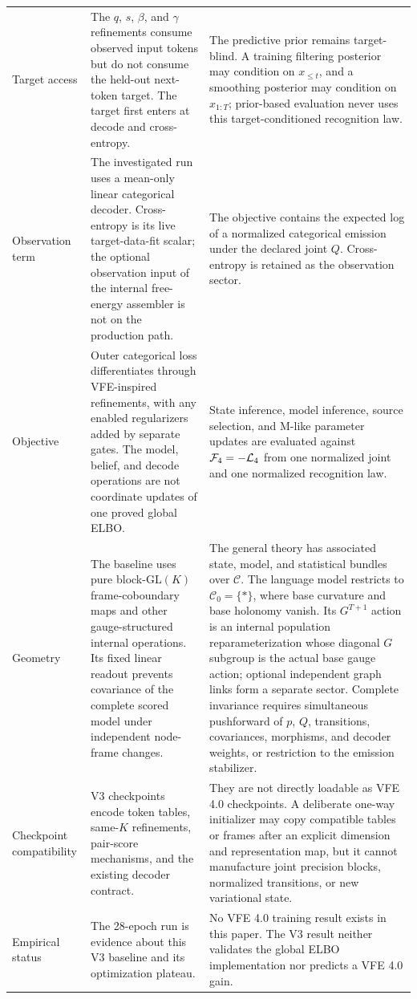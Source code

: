 \begin{longtable}{>{\raggedright\arraybackslash}p{} >{\raggedright\arraybackslash}p{} >{\raggedright\arraybackslash}p{}}
\addlinespace
Target access
& The $q$, $s$, $\beta$, and $\gamma$ refinements consume observed input tokens but do not consume the held-out next-token target. The target first enters at decode and cross-entropy.
& The predictive prior remains target-blind. A training filtering posterior may condition on $x_{\leq t}$, and a smoothing posterior may condition on $x_{1:T}$; prior-based evaluation never uses this target-conditioned recognition law. \\
\addlinespace
Observation term
& The investigated run uses a mean-only linear categorical decoder. Cross-entropy is its live target-data-fit scalar; the optional observation input of the internal free-energy assembler is not on the production path.
& The objective contains the expected log of a normalized categorical emission under the declared joint $Q$. Cross-entropy is retained as the observation sector. \\
\addlinespace
Objective
& Outer categorical loss differentiates through VFE-inspired refinements, with any enabled regularizers added by separate gates. The model, belief, and decode operations are not coordinate updates of one proved global ELBO.
& State inference, model inference, source selection, and M-like parameter updates are evaluated against $\mathcal F_4=-\mathcal L_4$ from one normalized joint and one normalized recognition law. \\
\addlinespace
Geometry
& The baseline uses pure block-$\mathrm{GL}(K)$ frame-coboundary maps and other gauge-structured internal operations. Its fixed linear readout prevents covariance of the complete scored model under independent node-frame changes.
& The general theory has associated state, model, and statistical bundles over $\mathcal C$. The language model restricts to $\mathcal C_0=\{\ast\}$, where base curvature and base holonomy vanish. Its $G^{T+1}$ action is an internal population reparameterization whose diagonal $G$ subgroup is the actual base gauge action; optional independent graph links form a separate sector. Complete invariance requires simultaneous pushforward of $p$, $Q$, transitions, covariances, morphisms, and decoder weights, or restriction to the emission stabilizer. \\
\addlinespace
Checkpoint compatibility
& V3 checkpoints encode token tables, same-$K$ refinements, pair-score mechanisms, and the existing decoder contract.
& They are not directly loadable as VFE 4.0 checkpoints. A deliberate one-way initializer may copy compatible tables or frames after an explicit dimension and representation map, but it cannot manufacture joint precision blocks, normalized transitions, or new variational state. \\
\addlinespace
Empirical status
& The 28-epoch run is evidence about this V3 baseline and its optimization plateau.
& No VFE 4.0 training result exists in this paper. The V3 result neither validates the global ELBO implementation nor predicts a VFE 4.0 gain. \\
\end{longtable}

